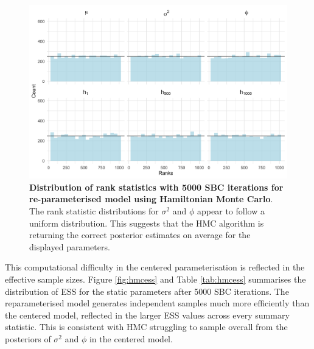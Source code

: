\documentclass[12pt, a4paper]{article}
\begin{document}
    \begin{figure}[H]
        \centering
        \includegraphics[scale=0.09]{results/hmc_ncp_5k.png}
        \caption{\textbf{Distribution of rank statistics with 5000 SBC iterations for re-parameterised model using Hamiltonian Monte Carlo}. The rank statistic distributions for $\sigma^2$ and $\phi$ appear to follow a uniform distribution. This suggests that the HMC algorithm is returning the correct posterior estimates on average for the displayed parameters.}
        \label{fig:ncphmc5k}
    \end{figure}

    This computational difficulty in the centered parameterisation is reflected in the effective sample sizes. Figure \ref{fig:hmcess} and Table \ref{tab:hmcess} summarises the distribution of ESS for the static parameters after 5000 SBC iterations. The reparameterised model generates independent samples much more efficiently than the centered model, reflected in the larger ESS values across every summary statistic.  This is consistent with HMC struggling to sample overall from the posteriors of $\sigma^2$ and $\phi$ in the centered model. 
\end{document}
